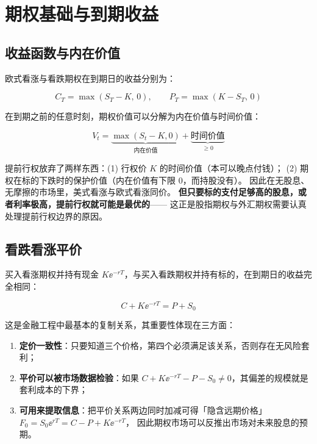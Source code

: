 \section{期权基础与到期收益}

\subsection{收益函数与内在价值}

欧式看涨与看跌期权在到期日的收益分别为：

\begin{equation}
  C_T = \max(S_T - K,\,0), \qquad P_T = \max(K - S_T,\,0)
  \label{eq:04-payoff}
\end{equation}

在到期之前的任意时刻，期权价值可以分解为内在价值与时间价值：

\begin{equation}
  V_t = \underbrace{\max(S_t-K,0)}_{\text{内在价值}}+\underbrace{\text{时间价值}}_{\ge 0}
  \label{eq:04-intrinsic}
\end{equation}

\begin{intuitionbox}
提前行权放弃了两样东西：(1) 行权价 $K$ 的时间价值（本可以晚点付钱）；
(2) 期权在标的下跌时的保护价值（内在价值有下限 $0$，而持股没有）。
因此在无股息、无摩擦的市场里，美式看涨与欧式看涨同价。
\textbf{但只要标的支付足够高的股息，或者利率极高，提前行权就可能是最优的}——
这正是股指期权与外汇期权需要认真处理提前行权边界的原因。
\end{intuitionbox}

\subsection{看跌看涨平价}

买入看涨期权并持有现金 $K\ee^{-rT}$，与买入看跌期权并持有标的，在到期日的收益完全相同：

\begin{equation}
  C + K\ee^{-rT} = P + S_0
  \label{eq:04-parity}
\end{equation}

这是金融工程中最基本的复制关系，其重要性体现在三方面：

\begin{enumerate}[leftmargin=1.8em]
  \item \textbf{定价一致性}：只要知道三个价格，第四个必须满足该关系，否则存在无风险套利；
  \item \textbf{平价可以被市场数据检验}：如果 $C + K\ee^{-rT} - P - S_0 \ne 0$，其偏差的规模就是套利成本的下界；
  \item \textbf{可用来提取信息}：把平价关系两边同时加减可得「隐含远期价格」$F_0 = S_0\ee^{rT} = C - P + K\ee^{-rT}$，
        因此期权市场可以反推出市场对未来股息的预期。
\end{enumerate}

